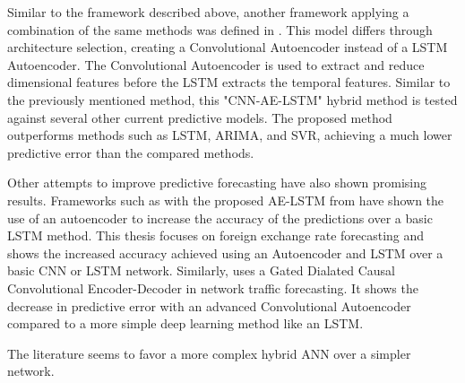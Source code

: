 Similar to the framework described above, another framework applying a combination of the same methods was defined in \cite{Zhao2019}.
This model differs through architecture selection, creating a Convolutional Autoencoder instead of a LSTM Autoencoder.
The Convolutional Autoencoder is used to extract and reduce dimensional features before the LSTM extracts the temporal features.
Similar to the previously mentioned method, this "CNN-AE-LSTM" hybrid method is tested against several other current predictive models.
The proposed method outperforms methods such as LSTM, ARIMA, and SVR, achieving a much lower predictive error than the compared methods.


Other attempts to improve predictive forecasting have also shown promising results.
Frameworks such as with the proposed AE-LSTM from \cite{VanHoa2021} have shown the use of an autoencoder to increase the accuracy of the predictions over a basic LSTM method.
This thesis focuses on foreign exchange rate forecasting and shows the increased accuracy achieved using an Autoencoder and LSTM over a basic CNN or LSTM network.
Similarly, \cite{Zhang2020} uses a Gated Dialated Causal Convolutional Encoder-Decoder in network traffic forecasting.
It shows the decrease in predictive error with an advanced Convolutional Autoencoder compared to a more simple deep learning method like an LSTM.

The literature seems to favor a more complex hybrid ANN over a simpler network.




\iffalse
  The proposed problem-space has data with high fluctuations and noise.
  In order to increase the predictive abilities of a model, a method well suited for working with data with high noise should be selected.
  A CNN-AE model should be able to solve this problem.
  The CNN is able to extract the spatial features of the data while the AE can filter out the noise and fluctuations in the data.
  By then adding a LSTM network at the end, the model should be able to extract the temoral featrues from the data.
  This hybrid framework should therefore be well suited for the task at hand.
\fi
